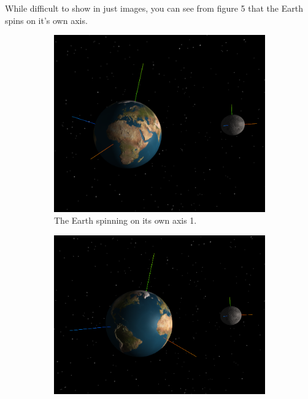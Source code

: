 \documentclass[12pt]{article}
\begin{document}
While difficult to show in just images, you can see from figure 5 that the Earth spins on it's own axis.
\begin{figure}[H]
        \centering
        \begin{subfigure}[b]{0.4\textwidth}
                \includegraphics[width=\textwidth]{images/earthandmoonaxisspin1}
                \caption{The Earth spinning on its own axis 1.}
                \label{fig: The axial spin of the Earth 1.}
       \end{subfigure}
        \begin{subfigure}[b]{0.4\textwidth}
                \includegraphics[width=\textwidth]{images/earthandmoonaxisspin2}

\end{subfigure}
\end{figure}
\end{document}
